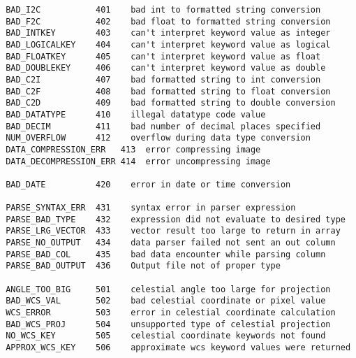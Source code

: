 \documentclass[11pt]{book}
\begin{document}
\begin{verbatim}
 BAD_I2C           401    bad int to formatted string conversion
 BAD_F2C           402    bad float to formatted string conversion
 BAD_INTKEY        403    can't interpret keyword value as integer
 BAD_LOGICALKEY    404    can't interpret keyword value as logical
 BAD_FLOATKEY      405    can't interpret keyword value as float
 BAD_DOUBLEKEY     406    can't interpret keyword value as double
 BAD_C2I           407    bad formatted string to int conversion
 BAD_C2F           408    bad formatted string to float conversion
 BAD_C2D           409    bad formatted string to double conversion
 BAD_DATATYPE      410    illegal datatype code value
 BAD_DECIM         411    bad number of decimal places specified
 NUM_OVERFLOW      412    overflow during data type conversion
 DATA_COMPRESSION_ERR   413  error compressing image
 DATA_DECOMPRESSION_ERR 414  error uncompressing image

 BAD_DATE          420    error in date or time conversion

 PARSE_SYNTAX_ERR  431    syntax error in parser expression
 PARSE_BAD_TYPE    432    expression did not evaluate to desired type
 PARSE_LRG_VECTOR  433    vector result too large to return in array
 PARSE_NO_OUTPUT   434    data parser failed not sent an out column
 PARSE_BAD_COL     435    bad data encounter while parsing column
 PARSE_BAD_OUTPUT  436    Output file not of proper type

 ANGLE_TOO_BIG     501    celestial angle too large for projection
 BAD_WCS_VAL       502    bad celestial coordinate or pixel value
 WCS_ERROR         503    error in celestial coordinate calculation
 BAD_WCS_PROJ      504    unsupported type of celestial projection
 NO_WCS_KEY        505    celestial coordinate keywords not found
 APPROX_WCS_KEY    506    approximate wcs keyword values were returned
\end{verbatim}
\end{document}
